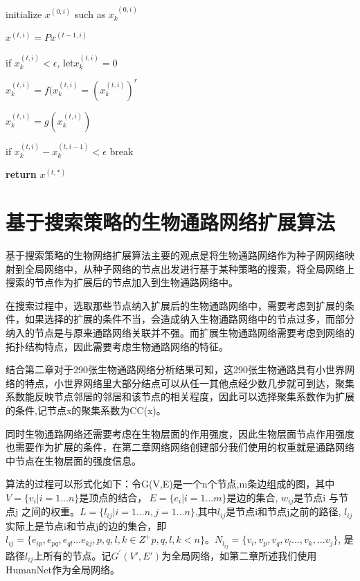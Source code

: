 \begin{algorithm}

%

{
	initialize $x^{(0, i)}$ such as $x^{\ \ ( 0,i)}_{k}$
    
	{
		$x^{(t,i)}=Px^{(t-1,i)}$

		if $x^{(t,i)}_{k} < \epsilon$, let$ x^{(t,i)}_{k}=0 $	

		 $x^{(t,i)}_{k}=f(x^{(t,i)}_{k}=(x^{(t,i)}_{k})^{r}$

		 $x^{(t,i)}_{k}=g(x^{(t,i)}_{k})$

		if  $x^{(t,i)}_{k} -  x^{(t,i-1)}_{k} < \epsilon$ break

 	}
}


\textbf{return} $x^{(t, *)}$
\end{algorithm}


\section{基于搜索策略的生物通路网络扩展算法}
基于搜索策略的生物网络扩展算法主要的观点是将生物通路网络作为种子网网络映射到全局网络中，从种子网络的节点出发进行基于某种策略的搜索，将全局网络上搜索的节点作为扩展后的节点加入到生物通路网络中。

在搜索过程中，选取那些节点纳入扩展后的生物通路网络中，需要考虑到扩展的条件，如果选择的扩展的条件不当，会造成纳入生物通路网络中的节点过多，而部分纳入的节点是与原来通路网络关联并不强。而扩展生物通路网络需要考虑到网络的拓扑结构特点，因此需要考虑生物通路网络的特征。

结合第二章对于290张生物通路网络分析结果可知，这290张生物通路具有小世界网络的特点，小世界网络里大部分结点可以从任一其他点经少数几步就可到达，聚集系数能反映节点邻居的邻居和该节点的相关程度，因此可以选择聚集系数作为扩展的条件,记节点x的聚集系数为CC(x)。

同时生物通路网络还需要考虑在生物层面的作用强度，因此生物层面节点作用强度也需要作为扩展的条件，在第二章网络网络创建部分我们使用的权重就是通路网络中节点在生物层面的强度信息。

算法的过程可以形式化如下：令G(V,E)是一个n个节点,m条边组成的图，其中$V=\{v_{i} |i=1...n\}$是顶点的结合，$\ E=\{e_{i} |i=1...m\}$是边的集合, $w_{ij}$是节点i 与节点j 之间的权重。$L= \{l_{ij} | i=1...n, j=1...n \}$,其中$l_{ij}$是节点i和节点j之前的路径, $l_{ij}$实际上是节点i和节点j的边的集合，即$l_{ij}=\{e_{ip} , e_{pq}, e_{ql}...e_{kj}, p,q,l,k\in Z^{+} p,q,l,k < n \}$。$N_{l_{ij}}=\{v_{i}, v_{p}, v_{q}, v_{l}...,v_{k},...v_{j}\}$, 是路径$l_{ij}$上所有的节点。记$G^{'}(V', E')$为全局网络，如第二章所述我们使用HumanNet作为全局网络。

